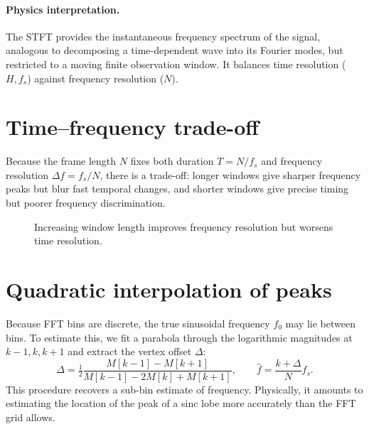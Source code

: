 \documentclass[11pt]{article}
\begin{document}
\paragraph{Physics interpretation.} The STFT provides the instantaneous frequency spectrum of the
signal, analogous to decomposing a time-dependent wave into its Fourier modes, but restricted to a
moving finite observation window. It balances time resolution ($H,f_s$) against frequency resolution
($N$).

\section*{Time--frequency trade-off}
Because the frame length $N$ fixes both duration $T=N/f_s$ and frequency resolution $\Delta f=f_s/N$,
there is a trade-off: longer windows give sharper frequency peaks but blur fast temporal changes,
and shorter windows give precise timing but poorer frequency discrimination.

\begin{figure}[h]
    \centering
    \caption{Increasing window length improves frequency resolution but worsens time resolution.}
\end{figure}

\section*{Quadratic interpolation of peaks}
Because FFT bins are discrete, the true sinusoidal frequency $f_0$ may lie between bins. To estimate
this, we fit a parabola through the logarithmic magnitudes at $k-1,k,k+1$ and extract the vertex
offset $\Delta$:
\begin{equation}
    \Delta=\tfrac{1}{2}\frac{M[k-1]-M[k+1]}{M[k-1]-2M[k]+M[k+1]},\qquad \hat f=\frac{k+\Delta}{N}f_s.
\end{equation}
This procedure recovers a sub-bin estimate of frequency. Physically, it amounts to estimating the
location of the peak of a sinc lobe more accurately than the FFT grid allows.
\end{document}
